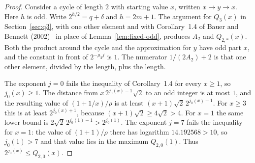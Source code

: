 \documentclass[11pt]{article}
\begin{document}
\begin{proof}
Consider a cycle of length $2$ with starting value $x$, written $x \to y \to x$.
Here $h$ is odd.
Write $2^{h/2} = q + \delta$ and $h = 2m+1$.
The argument for $Q_3(x)$ in Section~\ref{sec:q3}, with one other element and with Corollary~1.4 of Bauer and Bennett (2002)~\cite{bauer-bennett-2002} in place of Lemma~\ref{lem:fixed-odd}, produces $A_2$ and $Q_{2,*}(x)$.
Both the product around the cycle and the approximation for $y$ have odd part $x$, and the constant in front of $2^{-\mu_2 j}$ is $1$.
The numerator $1/(2A_2)+2$ is that one other element, divided by the length, plus the length.

The exponent $j = 0$ fails the inequality of Corollary~1.4 for every $x \ge 1$, so $j_0(x) \ge 1$.
The distance from $x\, 2^{j_0(x)-1}\sqrt{2}$ to an odd integer is at most $1$, and the resulting value of $(1+1/x)/\rho$ is at least $(x+1)\sqrt{2}\, 2^{j_0(x)-1}$.
For $x \ge 3$ this is at least $2^{j_0(x)+1}$, because $(x+1)\sqrt{2} \ge 4\sqrt{2} > 4$.
For $x = 1$ the same lower bound is $2\sqrt{2}\, 2^{j_0(1)-1} > 2^{j_0(1)}$.
The exponent $j = 7$ fails the inequality for $x = 1$: the value of $(1+1)/\rho$ there has logarithm $14.192568 > 10$, so $j_0(1) > 7$ and that value lies in the maximum $Q_{2,0}(1)$.
Thus $2^{j_0(x)} \le Q_{2,0}(x)$.


\end{proof}
\end{document}
